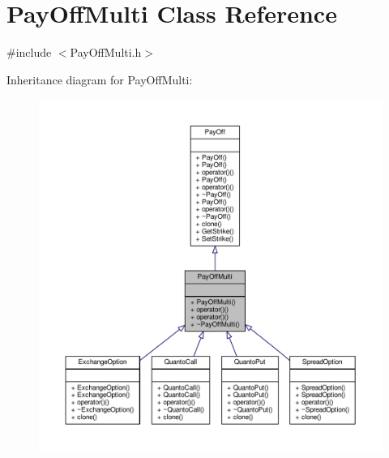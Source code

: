 \hypertarget{classPayOffMulti}{}\section{Pay\+Off\+Multi Class Reference}
\label{classPayOffMulti}


{\ttfamily \#include $<$Pay\+Off\+Multi.\+h$>$}



Inheritance diagram for Pay\+Off\+Multi\+:
\nopagebreak
\begin{figure}[H]
\begin{center}
\leavevmode
\includegraphics[width=350pt]{classPayOffMulti__inherit__graph}
\end{center}
\end{figure}


